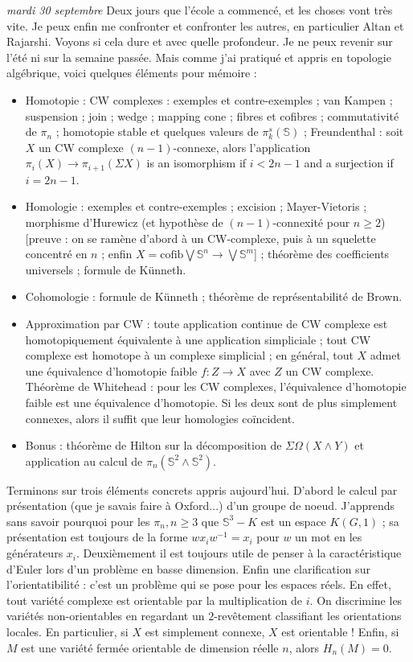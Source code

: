 \documentclass[11.8pt]{amsart}
\theoremstyle{plain}
\theoremstyle{definition}
\theoremstyle{remark}
\begin{document}
\textsl{mardi 30 septembre} \quad Deux jours que l'école a commencé, et les choses vont très vite. Je peux enfin me confronter et confronter les autres, en particulier Altan et Rajarshi. Voyons si cela dure et avec quelle profondeur. Je ne peux revenir sur l'été ni sur la semaine passée. Mais comme j'ai pratiqué et appris en topologie algébrique, voici quelques éléments pour mémoire : 
\begin{itemize}
\item Homotopie : CW complexes : exemples et contre-exemples ; van Kampen ; suspension ; join ; wedge ; mapping cone ; fibres et cofibres ; commutativité de $\pi_n$ ; homotopie stable et quelques valeurs de $\pi^{s}_k(\mathbb S)$ ; Freundenthal : soit $X$ un CW complexe $(n-1)$-connexe, alors l'application $\pi_i(X) \to \pi_{i+1}(\Sigma X)$ is an isomorphism if $i<2n-1$ and a surjection if $i=2n-1$.
\item Homologie : exemples et contre-exemples ; excision ; Mayer-Vietoris ; morphisme d'Hurewicz (et hypothèse de $(n-1)$-connexité pour $n\ge 2$) [preuve : on se ramène d'abord à un CW-complexe, puis à un squelette concentré en $n$ ; enfin $X = \text{cofib}{\bigvee\mathbb S^n \to \bigvee\mathbb S^m}$] ; théorème des coefficients universels ; formule de Künneth.
\item Cohomologie : formule de Künneth ; théorème de représentabilité de Brown.
\item Approximation par CW : toute application continue de CW complexe est homotopiquement équivalente à une application simpliciale ; tout CW complexe est homotope à un complexe simplicial ; en général, tout $X$ admet une équivalence d'homotopie faible $f : Z \to X$ avec $Z$ un CW complexe. Théorème de Whitehead : pour les CW complexes, l'équivalence d'homotopie faible est une équivalence d'homotopie. Si les deux sont de plus simplement connexes, alors il suffit que leur homologies coïncident. 
\item Bonus : théorème de Hilton sur la décomposition de $\Sigma \Omega(X\wedge Y)$ et application au calcul de $\pi_n(\mathbb S^2\wedge \mathbb S^2)$.
\end{itemize}

Terminons sur trois éléments concrets appris aujourd'hui. D'abord le calcul par présentation (que je savais faire à Oxford...) d'un groupe de noeud. J'apprends sans savoir pourquoi pour les $\pi_n, n\ge 3$ que $\mathbb S^3-K$ est un espace $K(G,1)$ ; sa présentation est toujours de la forme $wx_iw^{-1} = x_i$ pour $w$ un mot en les générateurs $x_i$. Deuxièmement il est toujours utile de penser à la caractéristique d'Euler lors d'un problème en basse dimension. Enfin une clarification sur l'orientatibilité : c'est un problème qui se pose pour les espaces réels. En effet, tout variété complexe est orientable par la multiplication de $i$. On discrimine les variétés non-orientables en regardant un $2$-revêtement classifiant les orientations locales. En particulier, si $X$ est simplement connexe, $X$ est orientable ! Enfin, si $M$ est une variété fermée orientable de dimension réelle $n$, alors $H_n(M)= 0$.
\end{document}
